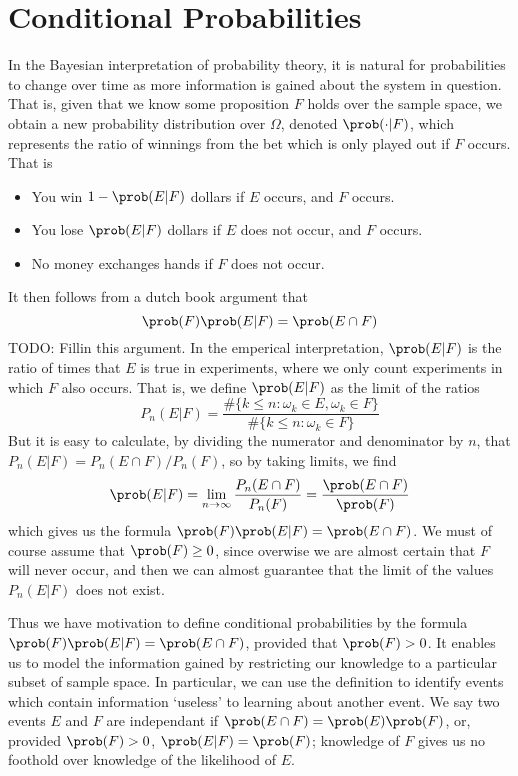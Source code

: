 \section{Conditional Probabilities}

In the Bayesian interpretation of probability theory, it is natural for probabilities to change over time as more information is gained about the system in question. That is, given that we know some proposition $F$ holds over the sample space, we obtain a new probability distribution over $\Omega$, denoted $\prob( \cdot | F)$, which represents the ratio of winnings from the bet which is only played out if $F$ occurs. That is
%
\begin{itemize}
    \item You win $1-\prob(E|F)$ dollars if $E$ occurs, and $F$ occurs.
    \item You lose $\prob(E|F)$ dollars if $E$ does not occur, and $F$ occurs.
    \item No money exchanges hands if $F$ does not occur.
\end{itemize}
%
It then follows from a dutch book argument that
%
\[ \prob(F) \prob(E | F) = \prob(E \cap F) \]
%
TODO: Fillin this argument. In the emperical interpretation, $\prob(E | F)$ is the ratio of times that $E$ is true in experiments, where we only count experiments in which $F$ also occurs. That is, we define $\prob(E | F)$ as the limit of the ratios
%
\[ P_n(E|F) = \frac{\# \{ k \leq n: \omega_k \in E, \omega_k \in F \}}{\# \{ k \leq n: \omega_k \in F \}} \]
%
But it is easy to calculate, by dividing the numerator and denominator by $n$, that $P_n(E|F) = P_n(E \cap F)/P_n(F)$, so by taking limits, we find
%
\[ \prob(E|F) = \lim_{n \to \infty} \frac{P_n(E \cap F)}{P_n(F)} = \frac{\prob(E \cap F)}{\prob(F)} \]
%
which gives us the formula $\prob(F) \prob(E | F) = \prob(E \cap F)$. We must of course assume that $\prob(F) \geq 0$, since overwise we are almost certain that $F$ will never occur, and then we can almost guarantee that the limit of the values $P_n(E|F)$ does not exist.

Thus we have motivation to define conditional probabilities by the formula $\prob(F) \prob(E|F) = \prob(E \cap F)$, provided that $\prob(F) > 0$. It enables us to model the information gained by restricting our knowledge to a particular subset of sample space. In particular, we can use the definition to identify events which contain information `useless' to learning about another event. We say two events $E$ and $F$ are independant if $\prob(E \cap F) = \prob(E) \prob(F)$, or, provided $\prob(F) > 0$, $\prob(E | F) = \prob(F)$; knowledge of $F$ gives us no foothold over knowledge of the likelihood of $E$.

